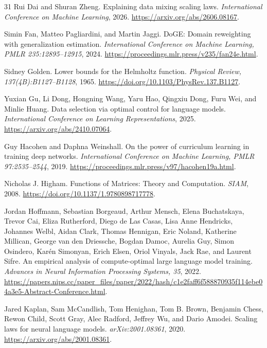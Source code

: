 \begin{thebibliography}{31}
Rui Dai and Shuran Zheng. Explaining data mixing scaling laws. \emph{International Conference on Machine Learning}, 2026. \url{https://arxiv.org/abs/2606.08167}.

Simin Fan, Matteo Pagliardini, and Martin Jaggi. DoGE: Domain reweighting with generalization estimation. \emph{International Conference on Machine Learning, PMLR 235:12895--12915}, 2024. \url{https://proceedings.mlr.press/v235/fan24e.html}.

Sidney Golden. Lower bounds for the Helmholtz function. \emph{Physical Review, 137(4B):B1127--B1128}, 1965. \url{https://doi.org/10.1103/PhysRev.137.B1127}.

Yuxian Gu, Li Dong, Hongning Wang, Yaru Hao, Qingxiu Dong, Furu Wei, and Minlie Huang. Data selection via optimal control for language models. \emph{International Conference on Learning Representations}, 2025. \url{https://arxiv.org/abs/2410.07064}.

Guy Hacohen and Daphna Weinshall. On the power of curriculum learning in training deep networks. \emph{International Conference on Machine Learning, PMLR 97:2535--2544}, 2019. \url{https://proceedings.mlr.press/v97/hacohen19a.html}.

Nicholas J. Higham. Functions of Matrices: Theory and Computation. \emph{SIAM}, 2008. \url{https://doi.org/10.1137/1.9780898717778}.

Jordan Hoffmann, Sebastian Borgeaud, Arthur Mensch, Elena Buchatskaya, Trevor Cai, Eliza Rutherford, Diego de Las Casas, Lisa Anne Hendricks, Johannes Welbl, Aidan Clark, Thomas Hennigan, Eric Noland, Katherine Millican, George van den Driessche, Bogdan Damoc, Aurelia Guy, Simon Osindero, Kar\'en Simonyan, Erich Elsen, Oriol Vinyals, Jack Rae, and Laurent Sifre. An empirical analysis of compute-optimal large language model training. \emph{Advances in Neural Information Processing Systems, 35}, 2022. \url{https://papers.nips.cc/paper_files/paper/2022/hash/c1e2faff6f588870935f114ebe04a3e5-Abstract-Conference.html}.

Jared Kaplan, Sam McCandlish, Tom Henighan, Tom B. Brown, Benjamin Chess, Rewon Child, Scott Gray, Alec Radford, Jeffrey Wu, and Dario Amodei. Scaling laws for neural language models. \emph{arXiv:2001.08361}, 2020. \url{https://arxiv.org/abs/2001.08361}.


\end{thebibliography}
